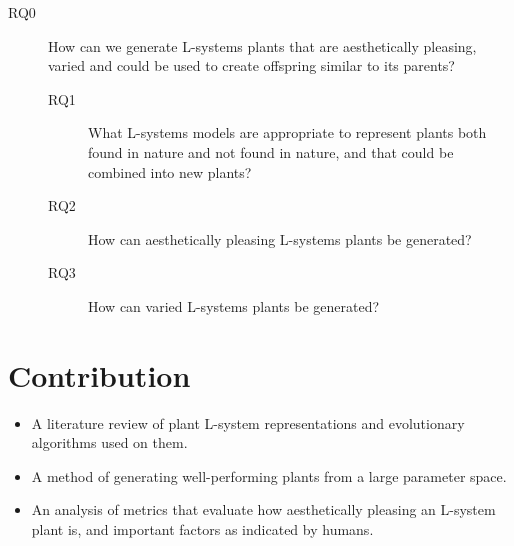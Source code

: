 \begin{description}
    \item[RQ0] How can we generate \glspl{L-system} plants that are aesthetically pleasing, varied and could be used to create offspring similar to its parents?
    \begin{description}
        \item[RQ1] What \glspl{L-system} models are appropriate to represent plants both found in nature and not found in nature, and that could be combined into new plants?
        \item[RQ2] How can aesthetically pleasing \glspl{L-system} plants be generated?
        \item[RQ3] How can varied \glspl{L-system} plants be generated?
    \end{description}
\end{description}

\section{Contribution}
\begin{itemize}
    \item A literature review of plant \gls{L-system} representations and evolutionary algorithms used on them.
    \item A method of generating well-performing plants from a large parameter space.
    \item An analysis of metrics that evaluate how aesthetically pleasing an \gls{L-system} plant is, and important factors as indicated by humans.
\end{itemize}
